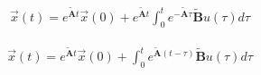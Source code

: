 \documentclass[12pt,a4paper,oneside]{book}
\begin{document}
\begin{onehalfspace}
\begin{equation}\label{discretization_css_7}
	\begin{aligned}
		\vec{x}(t) = e^{\tilde{\mathbf{A}}t} \vec{x}(0) + e^{\tilde{\mathbf{A}}t}  \int_{0}^{t}e^{-\tilde{\mathbf{A}}\tau} \tilde{\mathbf{B}}u(\tau)d\tau
	\end{aligned}
\end{equation}
\begin{mybox}
	\begin{equation}\label{discretization_css_8}
		\begin{aligned}
			\vec{x}(t) = e^{\tilde{\mathbf{A}}t} \vec{x}(0) + 
			\int_{0}^{t}e^{\tilde{\mathbf{A}}\left(t-\tau\right)} 
			\tilde{\mathbf{B}}u(\tau)d\tau
		\end{aligned}
	\end{equation}
\end{mybox}


\end{onehalfspace}
\end{document}
